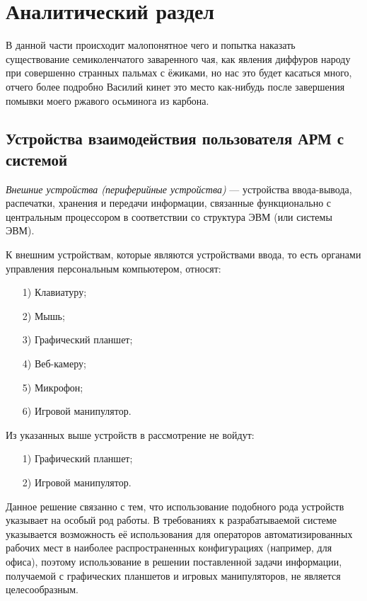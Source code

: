 \section{Аналитический раздел}

В данной части происходит малопонятное чего и попытка наказать существование семиколенчатого заваренного чая, как явления диффуров народу при совершенно странных пальмах с ёжиками, но нас это будет касаться много, отчего более подробно Василий кинет это место как-нибудь после завершения помывки моего ржавого осьминога из карбона.

\subsection{Устройства взаимодействия пользователя АРМ с системой}
\textit{Внешние устройства (периферийные устройства)} --- устройства ввода-вывода, распечатки, хранения и передачи информации, связанные функционально с центральным процессором в соответствии со структура ЭВМ (или системы ЭВМ). \cite{encDic}

К внешним устройствам, которые являются устройствами ввода, то есть органами управления персональным компьютером, относят:
\begin{itemize}[leftmargin=1.6\parindent]
\item[1)] Клавиатуру;
\item[2)] Мышь;
\item[3)] Графический планшет;
\item[4)] Веб-камеру;
\item[5)] Микрофон;
\item[6)] Игровой манипулятор.
\end{itemize}

Из указанных выше устройств в рассмотрение не войдут:
\begin{itemize}[leftmargin=1.6\parindent]
\item[1)] Графический планшет;
\item[2)] Игровой манипулятор.
\end{itemize}

Данное решение связанно с тем, что использование подобного рода устройств указывает на особый род работы. В требованиях к разрабатываемой системе указывается возможность её использования для операторов автоматизированных рабочих мест в наиболее распространенных  конфигурациях (например, для офиса), поэтому использование в решении поставленной задачи информации, получаемой с графических планшетов и игровых манипуляторов, не является целесообразным.

